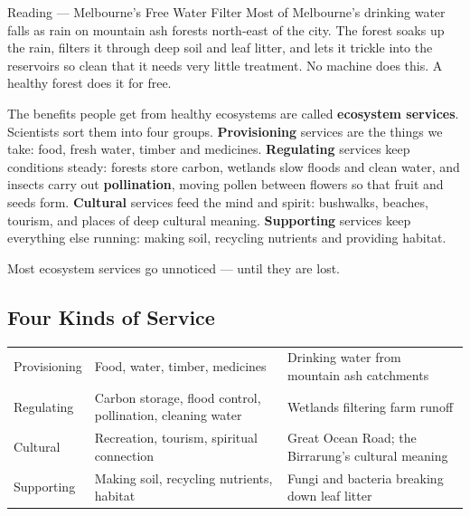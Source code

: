 \begin{readingbox}{Reading --- Melbourne's Free Water Filter}
Most of Melbourne's drinking water falls as rain on mountain ash forests north-east of the city. The forest soaks up the rain, filters it through deep soil and leaf litter, and lets it trickle into the reservoirs so clean that it needs very little treatment. No machine does this. A healthy forest does it for free.

The benefits people get from healthy ecosystems are called \textbf{ecosystem services}. Scientists sort them into four groups. \textbf{Provisioning} services are the things we take: food, fresh water, timber and medicines. \textbf{Regulating} services keep conditions steady: forests store carbon, wetlands slow floods and clean water, and insects carry out \textbf{pollination}, moving pollen between flowers so that fruit and seeds form. \textbf{Cultural} services feed the mind and spirit: bushwalks, beaches, tourism, and places of deep cultural meaning. \textbf{Supporting} services keep everything else running: making soil, recycling nutrients and providing habitat.

Most ecosystem services go unnoticed --- until they are lost.
\end{readingbox}

\rcreset
{}

\label{theory:7}

\subsection{Four Kinds of Service}\label{sub:7.1}

\begin{ctab}
\begin{tabular}{|L{2.2cm}|L{3.8cm}|L{4.0cm}|}
  \hline{} &  &  \\ \hline
  Provisioning & Food, water, timber, medicines & Drinking water from mountain ash catchments \\ \hline
  Regulating & Carbon storage, flood control, pollination, cleaning water & Wetlands filtering farm runoff \\ \hline
  Cultural & Recreation, tourism, spiritual connection & Great Ocean Road; the Birrarung's cultural meaning \\ \hline
  Supporting & Making soil, recycling nutrients, habitat & Fungi and bacteria breaking down leaf litter \\ \hline
\end{tabular}
\end{ctab}

